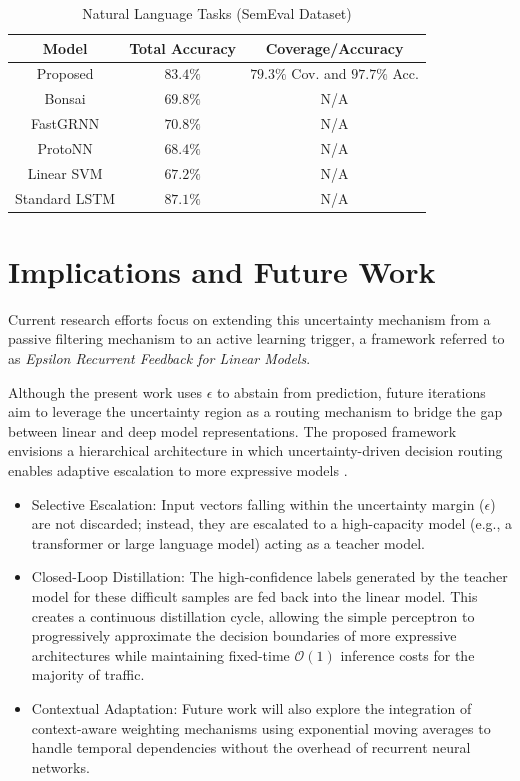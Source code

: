 \documentclass[conference]{IEEEtran}
\begin{document}
\begin{table}[H]
    \centering
        \caption{Natural Language Tasks (SemEval Dataset)}
    \label{tab:NLP-SemEval-Comparation}
    \begin{tabular}{c c c}
        \hline
        Model & Total Accuracy & Coverage/Accuracy\\
        \hline
        Proposed & $83.4\%$ & $79.3\%$ Cov. and $97.7\%$ Acc.\\
        Bonsai & $69.8\%$ & N/A\\
        FastGRNN & $70.8\%$ & N/A\\
        ProtoNN & $68.4\%$ & N/A\\
        Linear SVM & $67.2\%$ & N/A\\
        Standard LSTM & $87.1\%$ & N/A\\
        \hline
    \end{tabular}
\end{table}

\section{Implications and Future Work}

Current research efforts focus on extending this uncertainty mechanism from a passive filtering mechanism to an active learning trigger, a framework referred to as \textit{Epsilon Recurrent Feedback for Linear Models}.

Although the present work uses $\epsilon$ to abstain from prediction, future iterations aim to leverage the uncertainty region as a routing mechanism to bridge the gap between linear and deep model representations. The proposed framework envisions a hierarchical architecture in which uncertainty-driven decision routing enables adaptive escalation to more expressive models \cite{b1}.

\begin{itemize}

    \item Selective Escalation: Input vectors falling within the uncertainty margin ($\epsilon$) are not discarded; instead, they are escalated to a high-capacity model (e.g., a transformer or large language model) acting as a teacher model.
    
    \item Closed-Loop Distillation: The high-confidence labels generated by the teacher model for these difficult samples are fed back into the linear model. This creates a continuous distillation cycle, allowing the simple perceptron to progressively approximate the decision boundaries of more expressive architectures while maintaining fixed-time $\mathcal{O}(1)$ inference costs for the majority of traffic.
    
    \item Contextual Adaptation: Future work will also explore the integration of context-aware weighting mechanisms using exponential moving averages to handle temporal dependencies without the overhead of recurrent neural networks.
    
\end{itemize}
\end{document}
